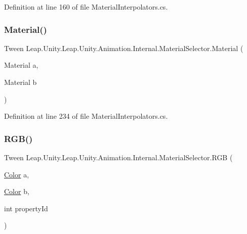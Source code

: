 Definition at line 160 of file Material\+Interpolators.\+cs.

\mbox{\label{struct_leap_1_1_unity_1_1_leap_1_1_unity_1_1_animation_1_1_internal_1_1_material_selector_acca452a6ebdd665db3e45f590437813b}} 
\subsubsection{\texorpdfstring{Material()}{Material()}}
{\footnotesize\ttfamily Tween Leap.\+Unity.\+Leap.\+Unity.\+Animation.\+Internal.\+Material\+Selector.\+Material (\begin{DoxyParamCaption}\item[{Material}]{a,  }\item[{Material}]{b }\end{DoxyParamCaption})}



Definition at line 234 of file Material\+Interpolators.\+cs.

\mbox{\label{struct_leap_1_1_unity_1_1_leap_1_1_unity_1_1_animation_1_1_internal_1_1_material_selector_ad975e7b02cde8b00236b097ea8cb1711}} 
\subsubsection{\texorpdfstring{RGB()}{RGB()}\hspace{0.1cm}{\footnotesize\ttfamily [1/2]}}
{\footnotesize\ttfamily Tween Leap.\+Unity.\+Leap.\+Unity.\+Animation.\+Internal.\+Material\+Selector.\+R\+GB (\begin{DoxyParamCaption}\item[{\mbox{\hyperlink{struct_leap_1_1_unity_1_1_leap_1_1_unity_1_1_animation_1_1_internal_1_1_material_selector_a4cee2e1cf1062ce91d3e8930fc5b838b}{Color}}}]{a,  }\item[{\mbox{\hyperlink{struct_leap_1_1_unity_1_1_leap_1_1_unity_1_1_animation_1_1_internal_1_1_material_selector_a4cee2e1cf1062ce91d3e8930fc5b838b}{Color}}}]{b,  }\item[{int}]{property\+Id }\end{DoxyParamCaption})}



